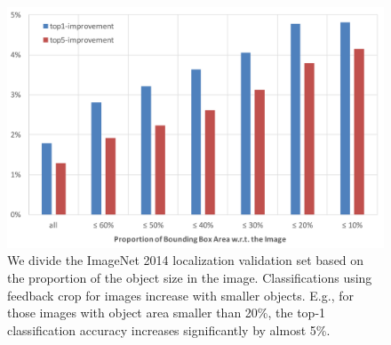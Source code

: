 \setlength{\tabcolsep}{2pt}
\begin{figure}[htb]
\begin{center}
\includegraphics[width=\columnwidth]{figs/re-classification/delta.pdf}
\caption{We divide the ImageNet 2014 localization validation set based on the proportion of the object size in the image. Classifications using feedback crop for images increase with smaller objects. E.g., for those images with object area smaller than 20\%, the top-1 classification accuracy increases significantly by almost 5\%.}
\label{fig:reclassification_delta}
\end{center}
\end{figure}

